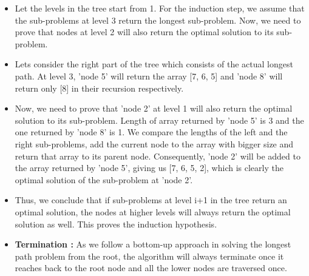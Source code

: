 \documentclass[12pt]{article}
\begin{document}
\begin{itemize}
    \item Let the levels in the tree start from 1. For the induction step, we assume that the sub-problems at level 3 return the longest sub-problem. Now, we need to prove that nodes at level 2 will also return the optimal solution to its sub-problem.
    \item Lets consider the right part of the tree which consists of the actual longest path. At level 3, 'node 5' will return the array [7, 6, 5] and 'node 8' will return only [8] in their recursion respectively.
    \item Now, we need to prove that 'node 2' at level 1 will also return the optimal solution to its sub-problem. Length of array returned by 'node 5' is 3 and the one returned by 'node 8' is 1. We compare the lengths of the left and the right sub-problems, add the current node to the array with bigger size and return that array to its parent node. Consequently, 'node 2' will be added to the array returned by 'node 5', giving us [7, 6, 5, 2], which is clearly the optimal solution of the sub-problem at 'node 2'.    
    \item Thus, we conclude that if sub-problems at level i+1 in the tree return an optimal solution, the nodes at higher levels will always return the optimal solution as well. This proves the induction hypothesis.
    \item \textbf{Termination :} As we follow a bottom-up approach in solving the longest path problem from the root, the algorithm will always terminate once it reaches back to the root node and all the lower nodes are traversed once. 
\end{itemize}
\end{document}
